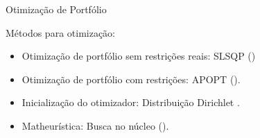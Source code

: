     \begin{frame}{Otimização de Portfólio}

        \LARGE
        Métodos para otimização:

        \begin{itemize}
            \item Otimização de portfólio sem restrições reais: SLSQP (\citeauthor{kraft1988sqlsp})
            \item Otimização de portfólio com restrições: APOPT (\citeauthor{hedengren2014nonlinear}).
            \item Inicialização do otimizador: Distribuição Dirichlet \cite{yang2022selective}.
            \item Matheurística:  Busca no núcleo (\citeauthor{angelelli2012kernel}).
        \end{itemize}

        
    \end{frame}





